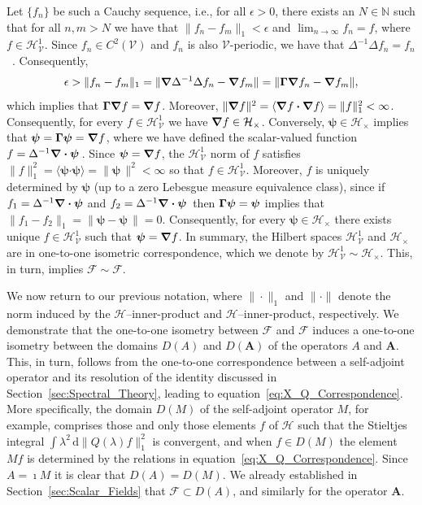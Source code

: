 \documentclass[leqno,onefignum,onetabnum]{siamltex1213}
\newcommand{\secref}[1]{Section~\ref{#1}}
\renewcommand{\d}{\mathrm{d}}
\newcommand{\Ab}{\mathbf{A}}
\newcommand{\Vc}{\mathcal{V}}
\newcommand{\Hc}{\mathcal{H}}
\newcommand{\Fc}{\mathcal{F}}
\newcommand{\Hs}{\mathscr{H}}
\newcommand{\Fs}{\mathscr{F}}
\newcommand\bGamma{\mbox{\boldmath${\Gamma}$}}
\newcommand\bnabla{\mbox{\boldmath${\nabla}$}}
\providecommand\bcdot{\boldsymbol{\cdot}}
\newcommand{\vecpsi}{\boldsymbol{\psi}}
\begin{document}
Let $\{f_n\}$ be such a Cauchy sequence, i.e., for all $\epsilon>0$, there
exists an $N\in\mathbb{N}$ such that for all $n,m>N$ we have that
$\|f_n-f_m\|_1<\epsilon$ and $\lim_{n\to\infty}f_n=f$, where $f\in\Hs^1_{\Vc}$. Since
$f_n\in C^2(\Vc)$ and $f_n$ is also $\Vc$-periodic, we have that $\Delta^{-1}\Delta
f_n=f_n$~\cite{McOwen:2003:PDE}. Consequently,  
%
\begin{align}\label{eq:Weak_Differentiation}
  \epsilon>\|f_n-f_m\|_1
   =\|\bnabla \Delta^{-1}\Delta f_n-\bnabla f_m\|
   =\|\bGamma\bnabla f_n-\bnabla f_m\|,
\end{align}
%
which implies that $\bGamma\bnabla f=\bnabla f$. Moreover, $\|\bnabla
f\|^2=\langle\bnabla f\bcdot\bnabla f\rangle=\|f\|_1^2<\infty$. Consequently, for every   
$f\in\Hs^1_{\Vc}$ we have $\bnabla f\in\Hc_\times$. Conversely,
$\vecpsi\in\Hc_\times$ implies that $\vecpsi=\bGamma\vecpsi=\bnabla f$, where
we have defined the scalar-valued function
$f=\Delta^{-1}\bnabla \bcdot\vecpsi\,$. Since $\vecpsi=\bnabla f$, the
$\Hs^1_{\Vc}$ norm of $f$ satisfies
$\|f\|_1^2=\langle\vecpsi\bcdot\vecpsi\rangle=\|\vecpsi\,\|^2<\infty$ so that
$f\in\Hs^1_{\Vc}$. Moreover, $f$ is uniquely determined by $\vecpsi$ (up
to a zero Lebesgue measure equivalence class), since if $f_1=\Delta^{-1}\bnabla
\bcdot\vecpsi$ and $f_2=\Delta^{-1}\bnabla \bcdot\vecpsi\,$ then
$\bGamma\vecpsi=\vecpsi$ implies that
$\|f_1-f_2\|_1=\|\vecpsi-\vecpsi\,\|=0$. Consequently, for every
$\vecpsi\in\Hc_\times$ there exists unique $f\in\Hs^1_{\Vc}$ such that
$\vecpsi=\bnabla f$.  In summary, the Hilbert spaces $\Hs^1_{\Vc}$ and
$\Hc_\times$ are in one-to-one isometric correspondence, which we denote by
$\Hs^1_{\Vc}\sim\Hc_\times$. This, in turn, implies  $\Fs\sim\Fc$.   



We now return to our previous notation, where $\|\cdot\|_1$ and $\|\cdot\|$
denote the norm induced by the $\Hs$--inner-product and
$\Hc$--inner-product, respectively. We demonstrate that the one-to-one
isometry between $\Fs$ and $\Fc$ induces a one-to-one isometry between
the domains $D(A)$ and $D(\Ab)$ of the operators $A$ and $\Ab$. This,
in turn, follows from the one-to-one 
correspondence between a self-adjoint operator and its resolution of
the identity discussed in \secref{sec:Spectral_Theory}, leading to
equation~\eqref{eq:X_Q_Correspondence}. More specifically, the domain
$D(M)$ of the self-adjoint operator $M$, for example, comprises those
and only those elements $f$ of $\Hs$ such that the Stieltjes integral
$\int\lambda^2\,\d\|Q(\lambda)f\|_1^2$ is convergent, and when $f\in D(M)$ the element $Mf$
is determined by the relations in
equation~\eqref{eq:X_Q_Correspondence}. Since $A=\imath M$ it is clear that
$D(A)=D(M)$. We already established in
\secref{sec:Scalar_Fields} that $\Fs\subset D(A)$, and similarly for the
operator $\Ab$.
\end{document}
